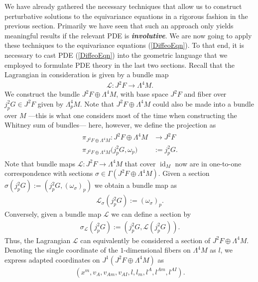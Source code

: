 We have already gathered the necessary techniques that allow us to construct perturbative solutions to the equivariance equations in a rigorous fashion in the previous section. Primarily we have seen that such an approach only yields meaningful results if the relevant PDE is \textit{\textbf{involutive}}. We are now going to apply these techniques to the equivariance equations (\ref{DiffeoEqn}). To that end, it is necessary to cast PDE (\ref{DiffeoEqn}) into the geometric language that we employed to formulate PDE theory in the last two sections. Recall that the Lagrangian in consideration is given by a bundle map
\begin{align}
\mathcal{L} : J^2F \longrightarrow \Lambda^4M.
\end{align}
We construct the bundle $J^2F \oplus \Lambda^4M$, with base space $J^2F$ and fiber over $j^2_pG \in J^2F$ given by $\Lambda^4_pM$. Note that $J^2F \oplus \Lambda^4M$ could also be made into a bundle over $M$ ---this is what one considers most of the time when constructing the Whitney sum of bundles--- here, however, we define the projection as
\begin{align}
    \begin{aligned}
     \pi_{J^2F \oplus \Lambda^4M} : J^2F \oplus \Lambda^4M &\longrightarrow J^2F \\
    \pi_{J^2F \oplus \Lambda^4M} \bigl (j^2_pG,\omega_p \bigr) &:= j^2_pG.
    \end{aligned}
\end{align}
Note that bundle maps $\mathcal{L} : J^2F \rightarrow \Lambda^4M$ that cover $\operatorname{id}_M$ now are in one-to-one correspondence with sections $\sigma \in \Gamma(J^2F \oplus \Lambda^4M)$.
Given a section $\sigma(j^2_pG):=(j^2_pG,(\omega_{\sigma})_p)$ we obtain a bundle map as 
\begin{align}\mathcal{L}_{\sigma} (j^2_pG) := (\omega_{\sigma})_p.
\end{align}
Conversely, given a bundle map $\mathcal{L}$ we can define a section by 
\begin{align}
\sigma_{\mathcal{L}}(j^2_pG) := (j^2_pG, \mathcal{L}(j^2_pG)).
\end{align}
Thus, the Lagrangian $\mathcal{L}$ can equivalently be considered a section of $J^2F\oplus \Lambda^4M$. 
Denoting the single coordinate of the $1$-dimensional fibers on $\Lambda^4M$ as $l$, we express adapted coordinates on $J^1(J^2F \oplus \Lambda^4M)$ as
\begin{align}
(x^m,v_A,v_{Am},v_{AI},l,l_{m},l^{A},l^{Am},l^{AI}).
\end{align}
